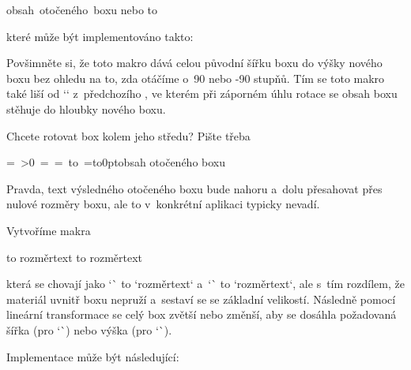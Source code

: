 {\begtt
{}\hbox{obsah otočeného boxu} 
nebo 
\vbox to 
\endtt


které může být implementováno takto: 

\begtt
\def\rotsimple#1{\hbox\bgroup\def\tmpb{#1}\afterassignment\rotsimpleA \setbox0=}%
\def\rotsimpleA{\aftergroup\rotsimpleB} 
\def\rotsimpleB{\setbox0=\hbox{\box0}%
   \ifnum\tmpb>0 \kern\ht0 \tmpdim=\dp0 \else \kern\dp0 \tmpdim=\ht0 \fi 
   \vbox to\wd0{\ifnum\tmpb>0 \vfill\fi 
                \vfil \wd0=0pt \dp0=0pt \ht0=0pt 
                \pdfsave\pdfrotate{\tmpb}\box0 \pdfrestore 
                \vfil}%
   \kern\tmpdim 
   \egroup} 
\endtt


Povšimněte si, že toto makro dává celou původní šířku boxu do výšky nového boxu bez ohledu na to, zda otáčíme o~90 nebo -90 stupňů. Tím se toto makro také liší od `\rotbox` z~předchozího , ve kterém při záporném úhlu rotace se obsah boxu stěhuje do hloubky nového boxu. 



Chcete rotovat box kolem jeho středu? Pište třeba 

\begtt
\rotsimple{90}\hbox to0pt{\hss obsah otočeného boxu\hss} 
\endtt


Pravda, text výsledného otočeného boxu bude nahoru a~dolu přesahovat přes nulové rozměry boxu, ale to v~konkrétní aplikaci typicky nevadí. 


 


Vytvoříme makra 

\begtt
\shbox to rozměr{text} 
\svbox to rozměr{text} 
\endtt


která se chovají jako `\hbox` to `rozměr{text}` a~`\vbox` to `rozměr{text}`, ale s~tím rozdílem, že materiál uvnitř boxu nepruží a~sestaví se se základní velikostí. Následně pomocí lineární transformace se celý box zvětší nebo změnší, aby se dosáhla požadovaná šířka (pro `\hbox`) nebo výška (pro `\vbox`). 



Implementace může být následující: 

\begtt
\def\shbox to#1#{\sboxA\hbox\wd{#1}} 
\def\svbox to#1#{\sboxA\vbox\ht{#1}} 
\def\sboxA#1#2#3#4{#1to#3{%
   \setbox0=#1{#4}\tmpdim=#3\relax \tmpnum=#20 
   \divide\tmpnum by256 \divide\tmpdim by\tmpnum \multiply\tmpdim by256 
   \edef\tmp{\expandafter\ignorept\the\tmpdim}%
   \ifx#1\hbox \vrule height\tmp\ht0 depth\tmp\dp0 width0pt 
   \else \hrule width\tmp\wd0 height0pt \tmpdim=\dp0 \fi 
   \ht0=0pt \dp0=0pt \wd0=0pt \pdfsave\pdfscale{\tmp}{\tmp}\box0\pdfrestore 
   \ifx#1\hbox\hfil 
   \else \vfil \hrule height0pt width0pt depth\tmp\tmpdim \fi}%
} 
\endtt


}
